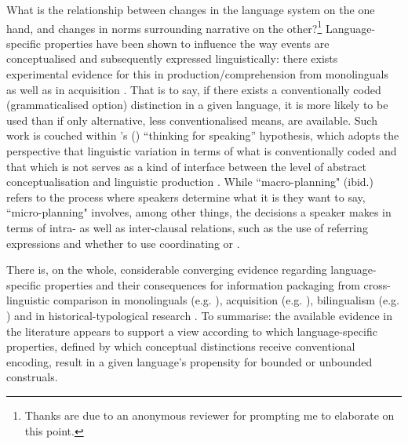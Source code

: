 \documentclass[output=paper,colorlinks,citecolor=brown]{langscibook}
\begin{document}
What is the relationship between changes in the language system on the one hand, and changes in norms surrounding narrative on the other?\footnote{Thanks are due to an anonymous reviewer for prompting me to elaborate on this point.} Language-specific properties have been shown to influence the way events are conceptualised and subsequently expressed linguistically: there exists experimental evidence for this in production/comprehension from monolinguals \citep{vonstutterheim2003} as well as in acquisition \citep{carroll2003information, flecken2013}. That is to say, if there exists a conventionally coded (grammaticalised option) distinction in a given language, it is more likely to be  used than if only alternative, less conventionalised means, are available. Such work is couched within \citeauthor{slobin1994talking}'s (\citeyear{slobin1994talking}) ``thinking for speaking'' hypothesis, which adopts the perspective that linguistic variation in terms of what is conventionally coded and that which is not serves as a kind of interface between the level of abstract conceptualisation and linguistic production \citep{levelt1993speaking}. While ``macro-planning" (ibid.) refers to the process where speakers determine what it is they want to say, ``micro-planning" involves, among other things, the decisions a speaker makes in terms of intra- as well as inter-clausal relations, such as the use of referring expressions and whether to use coordinating or  \citep{asher2005}.


There is, on the whole, considerable converging evidence regarding language-specific properties and their consequences for information packaging from cross-linguistic comparison in monolinguals (e.g. \citeauthor{starren2017} \citeyear{starren2017}), acquisition (e.g.  \citeauthor{schmiedtova2011} \citeyear{schmiedtova2011}), bilingualism (e.g. \citeauthor{daller2011} \citeyear{daller2011}) and in historical-typological research \citep{starren2017}. To summarise: the available evidence in the literature appears to support a view according to which language-specific properties, defined by which conceptual distinctions receive conventional encoding, result in a given language's propensity for bounded or unbounded construals. 
\end{document}
